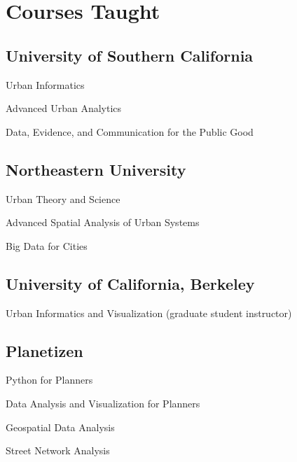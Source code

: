 \documentclass[11pt,a4paper]{report} %
\newcommand{\listitemspace}{0.25em}
\renewenvironment{itemize}
{
  \begin{list}{}{\setlength{\leftmargin}{0em}
      \setlength{\parskip}{0em}
      \setlength{\itemsep}{\listitemspace}
  \setlength{\parsep}{\listitemspace}}}
  {
\end{list}}
\begin{document}
\section*{Courses Taught}

\subsection*{University of Southern California}

\begin{itemize}

  \item Urban Informatics
  \item Advanced Urban Analytics
  \item Data, Evidence, and Communication for the Public Good

\end{itemize}

\subsection*{Northeastern University}

\begin{itemize}

  \item Urban Theory and Science
  \item Advanced Spatial Analysis of Urban Systems
  \item Big Data for Cities

\end{itemize}

\subsection*{University of California, Berkeley}

\begin{itemize}

  \item Urban Informatics and Visualization (graduate student instructor)

\end{itemize}

\subsection*{Planetizen}

\begin{itemize}

  \item Python for Planners
  \item Data Analysis and Visualization for Planners
  \item Geospatial Data Analysis
  \item Street Network Analysis

\end{itemize}
\end{document}
